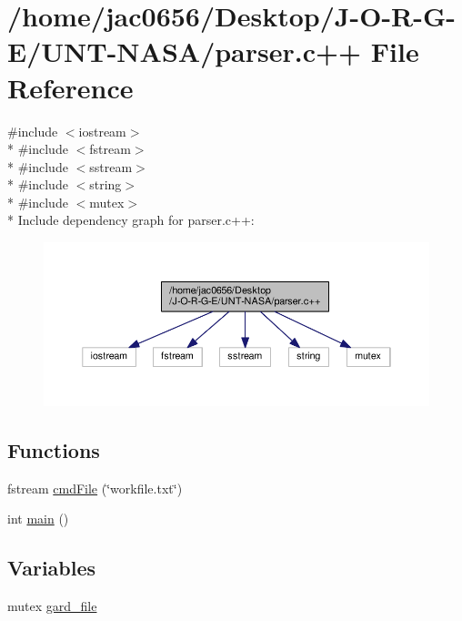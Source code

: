 \hypertarget{parser_8c_09_09}{}\section{/home/jac0656/\+Desktop/\+J-\/\+O-\/\+R-\/\+G-\/\+E/\+U\+N\+T-\/\+N\+A\+S\+A/parser.c++ File Reference}
\label{parser_8c_09_09}
{\ttfamily \#include $<$iostream$>$}\\*
{\ttfamily \#include $<$fstream$>$}\\*
{\ttfamily \#include $<$sstream$>$}\\*
{\ttfamily \#include $<$string$>$}\\*
{\ttfamily \#include $<$mutex$>$}\\*
Include dependency graph for parser.\+c++\+:
\nopagebreak
\begin{figure}[H]
\begin{center}
\leavevmode
\includegraphics[width=350pt]{parser_8c_09_09__incl}
\end{center}
\end{figure}
\subsection*{Functions}
\begin{DoxyCompactItemize}
\item 
fstream \hyperlink{parser_8c_09_09_ae589633d918ad5abb5d09cf70fcf951f}{cmd\+File} (\char`\"{}workfile.\+txt\char`\"{})
\item 
int \hyperlink{parser_8c_09_09_ae66f6b31b5ad750f1fe042a706a4e3d4}{main} ()
\end{DoxyCompactItemize}
\subsection*{Variables}
\begin{DoxyCompactItemize}
\item 
mutex \hyperlink{parser_8c_09_09_af720f0c5d7682d27ea06535a0408f010}{gard\+\_\+file}
\end{DoxyCompactItemize}


